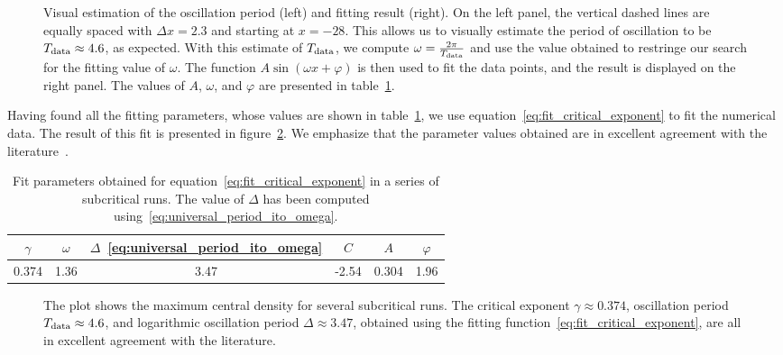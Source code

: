 \documentclass[a4paper,11pt]{article}
\newcommand{\g}{\gamma}
\newcommand{\D}{\Delta}
\newcommand{\lrpar}[1]{\left( #1 \right)}
\begin{document}
\begin{figure}[H]
  \centering
  
  \caption[Visual estimation of the oscillation period and fit.]{Visual estimation of the oscillation period (left) and fitting result (right). On the left panel, the vertical dashed lines are equally spaced with $\D x = 2.3$ and starting at $x=-28$. This allows us to visually estimate the period of oscillation to be $T_{\rm data}\approx4.6$, as expected. With this estimate of $T_{\rm data}$, we compute $\omega = \frac{2\pi}{T_{\rm data}}$ and use the value obtained to restringe our search for the fitting value of $\omega$. The function $A\sin\lrpar{\omega x+\varphi}$ is then used to fit the data points, and the result is displayed on the right panel. The values of $A$, $\omega$, and $\varphi$ are presented in table~\ref{tab:fit_critical_exponent}.}
  \label{fig:critical_exponent_oscillation}
\end{figure}

Having found all the fitting parameters, whose values are shown in table~\ref{tab:fit_critical_exponent}, we use equation~\eqref{eq:fit_critical_exponent} to fit the numerical data. The result of this fit is presented in figure~\ref{fig:critical_exponent}. We emphasize that the parameter values obtained are in excellent agreement with the literature~\cite{PhysRevLett.70.9,Baumgarte_2018,PhysRevD.55.R440,PhysRevD.92.084037}.

\begin{table}[ht]
  \centering
  \begin{tabular}{cccccc}
    \hline
    \hline
    $\g$ & $\omega$ & $\D$~\eqref{eq:universal_period_ito_omega} & $C$ & $A$ & $\varphi$\\
    \hline
    0.374 & 1.36 & 3.47 & -2.54 & 0.304 & 1.96\\
    \hline
    \hline
  \end{tabular}
  \caption[Fit parameters for the behaviour of the central energy density in a series of subcritical runs.]{Fit parameters obtained for equation~\eqref{eq:fit_critical_exponent} in a series of subcritical runs. The value of $\D$ has been computed using~\eqref{eq:universal_period_ito_omega}.}
  \label{tab:fit_critical_exponent}
\end{table}

\begin{figure}[H]
  \centering
  
  \caption[Central energy density near criticality.]{The plot shows the maximum central density for several subcritical runs. The critical exponent $\gamma\approx0.374$, oscillation period $T_{\rm data}\approx4.6$, and logarithmic oscillation period $\D\approx3.47$, obtained using the fitting function~\eqref{eq:fit_critical_exponent}, are all in excellent agreement with the literature.}
  \label{fig:critical_exponent}
\end{figure}
\end{document}
